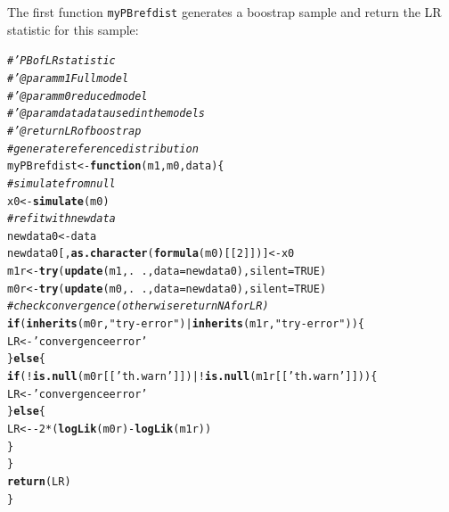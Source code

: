 \documentclass{scrartcl}\usepackage[]{graphicx}\usepackage[]{color}
\makeatletter
\newcommand{\hlnum}[1]{\textcolor[rgb]{0.686,0.059,0.569}{#1}}%
\newcommand{\hlstr}[1]{\textcolor[rgb]{0.192,0.494,0.8}{#1}}%
\newcommand{\hlcom}[1]{\textcolor[rgb]{0.678,0.584,0.686}{\textit{#1}}}%
\newcommand{\hlopt}[1]{\textcolor[rgb]{0,0,0}{#1}}%
\newcommand{\hlstd}[1]{\textcolor[rgb]{0.345,0.345,0.345}{#1}}%
\newcommand{\hlkwa}[1]{\textcolor[rgb]{0.161,0.373,0.58}{\textbf{#1}}}%
\newcommand{\hlkwb}[1]{\textcolor[rgb]{0.69,0.353,0.396}{#1}}%
\newcommand{\hlkwc}[1]{\textcolor[rgb]{0.333,0.667,0.333}{#1}}%
\newcommand{\hlkwd}[1]{\textcolor[rgb]{0.737,0.353,0.396}{\textbf{#1}}}%
\newenvironment{kframe}{%
 \def\at@end@of@kframe{}%
 \ifinner\ifhmode%
  \def\at@end@of@kframe{\end{minipage}}%
  \begin{minipage}{\columnwidth}%
 \fi\fi%
 \def\FrameCommand##1{\hskip\@totalleftmargin \hskip-\fboxsep
 \colorbox{shadecolor}{##1}\hskip-\fboxsep
     \hskip-\linewidth \hskip-\@totalleftmargin \hskip\columnwidth}%
 \MakeFramed {\advance\hsize-\width
   \@totalleftmargin\z@ \linewidth\hsize
   \@setminipage}}%
 {\par\unskip\endMakeFramed%
 \at@end@of@kframe}
\newenvironment{knitrout}{}{} %
\renewenvironment{knitrout}{\begin{spacing}{1}}{\end{spacing}}
\makeatother
\begin{document}
The first function \texttt{myPBrefdist} generates a boostrap sample and return the LR statistic for this sample:
\begin{knitrout}
\color{fgcolor}\begin{kframe}
\begin{alltt}
\hlcom{#' PB of LR statistic}
\hlcom{#' @param m1 Full model}
\hlcom{#' @param m0 reduced model}
\hlcom{#' @param  data data used in the models}
\hlcom{#' @return LR of boostrap}
\hlcom{# generate reference distribution}
\hlstd{myPBrefdist} \hlkwb{<-} \hlkwa{function}\hlstd{(}\hlkwc{m1}\hlstd{,} \hlkwc{m0}\hlstd{,} \hlkwc{data}\hlstd{)\{}
  \hlcom{# simulate from null}
  \hlstd{x0} \hlkwb{<-} \hlkwd{simulate}\hlstd{(m0)}
  \hlcom{# refit with new data}
  \hlstd{newdata0} \hlkwb{<-} \hlstd{data}
  \hlstd{newdata0[ ,} \hlkwd{as.character}\hlstd{(}\hlkwd{formula}\hlstd{(m0)[[}\hlnum{2}\hlstd{]])]} \hlkwb{<-} \hlstd{x0}
  \hlstd{m1r} \hlkwb{<-}  \hlkwd{try}\hlstd{(}\hlkwd{update}\hlstd{(m1, .}\hlopt{~}\hlstd{.,} \hlkwc{data} \hlstd{= newdata0),} \hlkwc{silent} \hlstd{=} \hlnum{TRUE}\hlstd{)}
  \hlstd{m0r} \hlkwb{<-} \hlkwd{try}\hlstd{(}\hlkwd{update}\hlstd{(m0, .}\hlopt{~}\hlstd{.,} \hlkwc{data} \hlstd{= newdata0),} \hlkwc{silent} \hlstd{=} \hlnum{TRUE}\hlstd{)}
  \hlcom{# check convergence (otherwise return NA for LR)}
  \hlkwa{if}\hlstd{(}\hlkwd{inherits}\hlstd{(m0r,} \hlstr{"try-error"}\hlstd{)} \hlopt{|} \hlkwd{inherits}\hlstd{(m1r,} \hlstr{"try-error"}\hlstd{))\{}
    \hlstd{LR} \hlkwb{<-} \hlstr{'convergence error'}
  \hlstd{\}} \hlkwa{else} \hlstd{\{}
    \hlkwa{if}\hlstd{(}\hlopt{!}\hlkwd{is.null}\hlstd{(m0r[[}\hlstr{'th.warn'}\hlstd{]])} \hlopt{| !}\hlkwd{is.null}\hlstd{(m1r[[}\hlstr{'th.warn'}\hlstd{]]))\{}
      \hlstd{LR} \hlkwb{<-} \hlstr{'convergence error'}
    \hlstd{\}} \hlkwa{else} \hlstd{\{}
      \hlstd{LR} \hlkwb{<-} \hlopt{-}\hlnum{2} \hlopt{*} \hlstd{(}\hlkwd{logLik}\hlstd{(m0r)} \hlopt{-} \hlkwd{logLik}\hlstd{(m1r))}
    \hlstd{\}}
  \hlstd{\}}
  \hlkwd{return}\hlstd{(LR)}
\hlstd{\}}
\end{alltt}
\end{kframe}
\end{knitrout}
\end{document}

